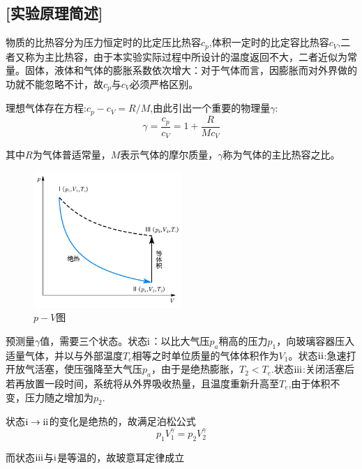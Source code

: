 \documentclass[UTF8]{article}
\begin{document}
	\subsection*{[实验原理简述]}
	\par 物质的比热容分为压力恒定时的比定压比热容$c_p$,体积一定时的比定容比热容$c_V$,二者又称为主比热容，由于本实验实际过程中所设计的温度返回不大，二者近似为常量。固体，液体和气体的膨胀系数依次增大：对于气体而言，因膨胀而对外界做的功就不能忽略不计，故$c_p$与$c_V$必须严格区别。
	\par 理想气体存在方程:$c_p-c_V=R / M$,由此引出一个重要的物理量$\gamma$:
	\[\gamma=\frac{c_p}{c_V}=1+\frac{R}{M c_V} \]
	\par 其中$R$为气体普适常量，$M$表示气体的摩尔质量，$\gamma$称为气体的主比热容之比。
	
	\begin{figure}%
		\centering
		\includegraphics[width=0.5\textwidth]{p-V图}
		\caption{\footnotesize $p-V$图}
	\end{figure}
	\par 预测量$\gamma$值，需要三个状态。状态$\textup{\uppercase\expandafter{\romannumeral1}}$：以比大气压$p_a$稍高的压力$p_1$，向玻璃容器压入适量气体，并以与外部温度$T_e$相等之时单位质量的气体体积作为$V_1$。状态$\textup{\uppercase\expandafter{\romannumeral2}}$:急速打开放气活塞，使压强降至大气压$p_a$，由于是绝热膨胀，$T_2<T_e$.状态$\textup{\uppercase\expandafter{\romannumeral3}}$:关闭活塞后若再放置一段时间，系统将从外界吸收热量，且温度重新升高至$T_e$,由于体积不变，压力随之增加为$p_2$.
	\par 状态$\textup{\uppercase\expandafter{\romannumeral1}}\to\textup{\uppercase\expandafter{\romannumeral2}}$的变化是绝热的，故满足泊松公式
	\begin{equation*}
		p_1V_1^{\gamma}=p_2V_2^{\gamma}
	\end{equation*}
	\par 而状态$\textup{\uppercase\expandafter{\romannumeral3}}$与$\textup{\uppercase\expandafter{\romannumeral1}}$是等温的，故玻意耳定律成立
\end{document}
